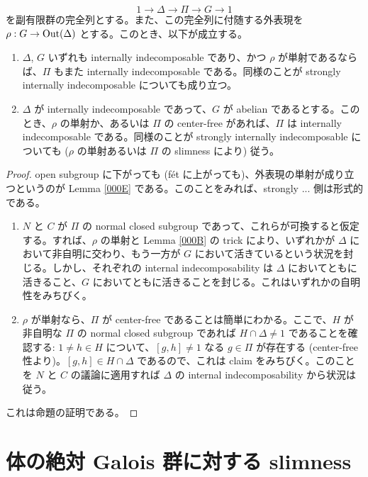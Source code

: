\begin{prop}\label{000G}
  \[
    1 \to \Delta \to \Pi \to G \to 1
  \]
  を副有限群の完全列とする。また、この完全列に付随する外表現を $\rho: G \to \mathrm{Out}(\Delta)$ とする。このとき、以下が成立する。
  \begin{enumerate}
  \item $\Delta$, $G$ いずれも internally indecomposable であり、かつ $\rho$ が単射であるならば、$\Pi$ もまた internally indecomposable である。同様のことが strongly internally indecomposable についても成り立つ。
  \item $\Delta$ が internally indecomposable であって、$G$ が abelian であるとする。このとき、$\rho$ の単射か、あるいは $\Pi$ の center-free があれば、$\Pi$ は internally indecomposable である。同様のことが strongly internally indecomposable についても ($\rho$ の単射あるいは $\Pi$ の slimness により) 従う。
  \end{enumerate}
\end{prop}
\begin{proof}
  open subgroup に下がっても (f\'{e}t に上がっても)、外表現の単射が成り立つというのが Lemma \ref{000E} である。このことをみれば、strongly ... 側は形式的である。
  \begin{enumerate}
    \item $N$ と $C$ が $\Pi$ の normal closed subgroup であって、これらが可換すると仮定する。すれば、$\rho$ の単射と Lemma \ref{000B} の trick により、いずれかが $\Delta$ において非自明に交わり、もう一方が $G$ において活きているという状況を封じる。しかし、それぞれの internal indecomposability は $\Delta$ においてともに活きること、$G$ においてともに活きることを封じる。これはいずれかの自明性をみちびく。
    \item $\rho$ が単射なら、$\Pi$ が center-free であることは簡単にわかる。ここで、$H$ が非自明な $\Pi$ の normal closed subgroup であれば $H \cap \Delta \neq 1$ であることを確認する: $1 \neq h \in H$ について、$[g, h] \neq 1$ なる $g \in \Pi$ が存在する (center-free 性より)。$[g, h] \in H \cap \Delta$ であるので、これは claim をみちびく。このことを $N$ と $C$ の議論に適用すれば $\Delta$ の internal indecomposability から状況は従う。
  \end{enumerate}
  これは命題の証明である。
\end{proof}

\section{体の絶対 Galois 群に対する slimness}

